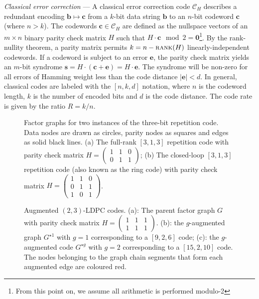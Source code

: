\documentclass[%
 reprint,
superscriptaddress,
nofootinbib,
 amsmath,amssymb,
secnumarabic
]{revtex4-1}
\begin{document}
\textit{Classical error correction} --- A classical error correction code $\mathcal{C}_H$ describes a redundant encoding $\mathbf{b}\mapsto \mathbf{c}$ from a $k$-bit data string $\mathbf{b}$ to an $n$-bit codeword $\mathbf{c}$ (where $n>k$). The codewords $\mathbf{c}\in\mathcal{C}_H$ are defined as the nullspace vectors of an $m\times n$ binary parity check matrix $H$ such that $H\cdot \mathbf{c}\mod{2}=\mathbf{0}$\footnote{From this point on, we assume all arithmetic is performed modulo-2}. By the rank-nullity theorem, a parity matrix permits $k=n-\text{\sc rank}(H)$ linearly-independent codewords. If a codeword is subject to an error $\mathbf{e}$, the parity check matrix yields an $m$-bit syndrome $\mathbf{s}=H\cdot(\mathbf{c}+\mathbf{e})=H\cdot \mathbf{e}$. The syndrome will be non-zero for all errors of Hamming weight less than the code distance $|\mathbf{e}|<d$. In general, classical codes are labeled with the $[n,k,d]$ notation, where $n$ is the codeword length, $k$ is the number of encoded bits and $d$ is the code distance. The code rate is given by the ratio $R=k/n$.


\begin{figure}

	\subfloat[]{}
	\subfloat[]{  }
	
\caption{Factor graphs for two instances of the three-bit repetition code. Data nodes are drawn as circles, parity nodes as squares and edges as solid black lines. (a) The full-rank $[3,1,3]$ repetition code with parity check matrix $H=\left( \begin{smallmatrix}1&1&0\\0&1&1\end{smallmatrix} \right)$; (b) The closed-loop $[3,1,3]$ repetition code (also known as the ring code) with parity check matrix $H=\left(\begin{smallmatrix} 1&1&0\\0&1&1\\1&0&1 \end{smallmatrix}\right)$.}
\label{fig:factor_graphs}	
\end{figure}

\begin{figure} 
	
	\qquad \qquad
	\qquad \qquad

	
\caption{Augmented $(2,3)$-LDPC codes. (a): The parent factor graph $G$ with parity check matrix $H=\left(\begin{smallmatrix}1 & 1 &1\\1&1&1\end{smallmatrix}\right)$. (b): the $g$-augmented graph $G^{\star 1}$ with $g=1$ corresponding to a $[9,2,6]$ code; (c): the $g$-augmented code $G^{\star g}$ with $g=2$ corresponding to a $[15,2,10]$ code. The nodes belonging to the graph chain segments that form each augmented edge are coloured red.}  \label{fig:aug_codes}
\end{figure}
\end{document}
